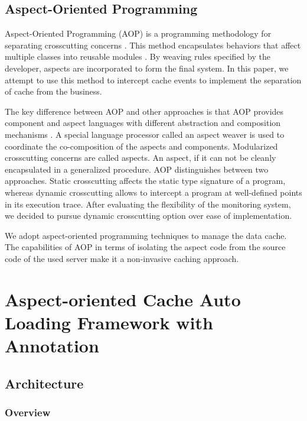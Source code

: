 \documentclass{singlecol-new}
\theoremstyle{TH}{
\newtheorem{lemma}{Lemma}
\newtheorem{theorem}[lemma]{Theorem}
\newtheorem{corrolary}[lemma]{Corrolary}
\newtheorem{conjecture}[lemma]{Conjecture}
\newtheorem{proposition}[lemma]{Proposition}
\newtheorem{claim}[lemma]{Claim}
\newtheorem{stheorem}[lemma]{Wrong Theorem}
}
\theoremstyle{THrm}{
\newtheorem{definition}{Definition}[section]
\newtheorem{question}{Question}[section]
\newtheorem{remark}{Remark}
\newtheorem{scheme}{Scheme}
}
\theoremstyle{THhit}{
\newtheorem{case}{Case}[section]
}
\begin{document}
\subsection{Aspect-Oriented Programming}
Aspect-Oriented Programming (AOP) is a programming methodology for separating crosscutting concerns \cite{kiczales2001aspect}. This method encapsulates behaviors that affect multiple classes into reusable modules \cite{ma2013toward}. By weaving rules specified by the developer, aspects are incorporated to form the final system. In this paper, we attempt to use this method to intercept cache events to implement the separation of cache from the business.

The key difference between AOP and other approaches is that AOP provides component and aspect languages with different abstraction and composition mechanisms \cite{pinto2017lara}. A special language processor called an aspect weaver is used to coordinate the co-composition of the aspects and components. Modularized crosscutting concerns are called aspects. An aspect, if it can not be cleanly encapsulated in a generalized procedure. AOP distinguishes between two approaches. Static crosscutting affects the static type signature of a program, whereas dynamic crosscutting allows to intercept a program at well-defined points in its execution trace. After evaluating the flexibility of the monitoring system, we decided to pursue dynamic crosscutting option over ease of implementation.

We adopt aspect-oriented programming techniques to manage the data cache. The capabilities of AOP in terms of isolating the aspect code from the source code of the used server make it a non-invasive caching approach.

\section{Aspect-oriented Cache Auto Loading Framework with Annotation}
\label{Framework}

\subsection{Architecture}

\subsubsection{Overview}
\end{document}
